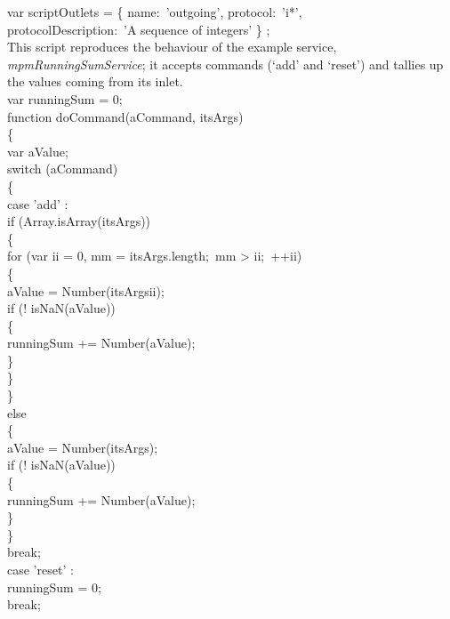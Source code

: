 var scriptOutlets = \openSq{} \{ name:\ 'outgoing', protocol:\ 'i*',\\
\tS\tS\tS\tS\tS\tS\tS\tS\tS\tS{}protocolDescription:\ 'A sequence of integers' \}
\closeSq;\\
\codeEnd{}
\secondaryEnd{}
\newpage
{}
This script reproduces the behaviour of the example service,
\emph{mpmRunningSumService}; it accepts commands (`add' and `reset') and tallies up the
values coming from its inlet.\\

\codeBegin{}
var runningSum = 0;\\

function doCommand(aCommand, itsArgs)\\
\{\\
\tS{}var aValue;\\
    
\tS{}switch (aCommand)\\
\tS\{\\
\tS\tS{}case 'add' :\\
\tS\tS\tS{}if (Array.isArray(itsArgs))\\
\tS\tS\tS\{\\
\tS\tS\tS\tS{}for (var ii = 0, mm = itsArgs.length;\ mm > ii;\ ++ii)\\
\tS\tS\tS\tS\{\\
\tS\tS\tS\tS\tS{}aValue = Number(itsArgs\openSq{}ii\closeSq);\\
\tS\tS\tS\tS\tS{}if (! isNaN(aValue))\\
\tS\tS\tS\tS\tS\{\\
\tS\tS\tS\tS\tS\tS{}runningSum += Number(aValue);\\
\tS\tS\tS\tS\tS\}\\
\tS\tS\tS\tS\}\\
\tS\tS\tS\}\\
\tS\tS\tS{}else\\
\tS\tS\tS\{\\
\tS\tS\tS\tS{}aValue = Number(itsArgs);\\
\tS\tS\tS\tS{}if (! isNaN(aValue))\\
\tS\tS\tS\tS\{\\
\tS\tS\tS\tS\tS{}runningSum += Number(aValue);\\
\tS\tS\tS\tS\}\\
\tS\tS\tS\}\\
\tS\tS\tS{}break;\\
            
\tS\tS{}case 'reset' :\\
\tS\tS\tS{}runningSum = 0;\\
\tS\tS\tS{}break;\\
            
